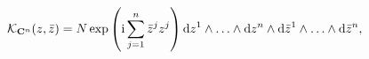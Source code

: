 \begin{equation}
{\cal K}_{{\bf C}^n}(z, \bar z) = N \,{\rm exp}\left({\rm i}\sum_{j=1}^n\bar z^j z^j\right)
{\rm d}z^1\wedge\ldots\wedge{\rm d}z^n\wedge{\rm d}\bar z^1\wedge\ldots\wedge{\rm d}\bar z^n,
\label{ceene}
\end{equation}


